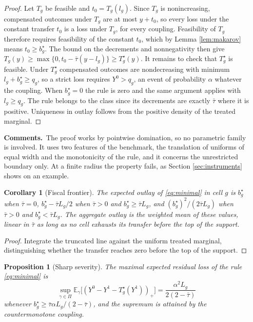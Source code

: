 \documentclass[11pt,a4paper]{article}
\theoremstyle{notesplain}
\newtheorem{proposition}[theorem]{Proposition}
\newtheorem{corollary}[theorem]{Corollary}
\theoremstyle{notesupright}
\numberwithin{equation}{section}
\newcommand{\comments}{\par\smallskip\noindent\textbf{Comments.}\ }
\newcommand{\E}{\mathbb{E}}
\begin{document}
\begin{proof}
Let $T_g$ be feasible and $t_0=T_g(l_g)$. Since $T_g$ is nonincreasing, compensated outcomes under $T_g$ are at most $y+t_0$, so every loss under the constant transfer $t_0$ is a loss under $T_g$, for every coupling. Feasibility of $T_g$ therefore requires feasibility of the constant $t_0$, which by Lemma \ref{lem:makarov} means $t_0\ge b^\star_g$. The bound on the decrements and nonnegativity then give $T_g(y)\ge\max\{0,t_0-\bar\tau(y-l_g)\}\ge T^\star_g(y)$. It remains to check that $T^\star_g$ is feasible. Under $T^\star_g$ compensated outcomes are nondecreasing with minimum $l_g+b^\star_g\ge q_g$, so a strict loss requires $Y^0>q_g$, an event of probability $\alpha$ whatever the coupling. When $b^\star_g=0$ the rule is zero and the same argument applies with $l_g\ge q_g$. The rule belongs to the class since its decrements are exactly $\bar\tau$ where it is positive. Uniqueness in outlay follows from the positive density of the treated marginal.
\end{proof}

\comments The proof works by pointwise domination, so no parametric family is involved. It uses two features of the benchmark, the translation of uniforms of equal width and the monotonicity of the rule, and it concerns the unrestricted boundary only. At a finite radius the property fails, as Section \ref{sec:instruments} shows on an example.

\begin{corollary}[Fiscal frontier]
\label{cor:frontier}
The expected outlay of \eqref{eq:minimal} in cell $g$ is $b^\star_g$ when $\bar\tau=0$, $b^\star_g-\bar\tau L_g/2$ when $\bar\tau>0$ and $b^\star_g\ge\bar\tau L_g$, and $(b^\star_g)^2/(2\bar\tau L_g)$ when $\bar\tau>0$ and $b^\star_g<\bar\tau L_g$. The aggregate outlay is the weighted mean of these values, linear in $\bar\tau$ as long as no cell exhausts its transfer before the top of the support.
\end{corollary}

\begin{proof}
Integrate the truncated line against the uniform treated marginal, distinguishing whether the transfer reaches zero before the top of the support.
\end{proof}

\begin{proposition}[Sharp severity]
\label{prop:severity}
The maximal expected residual loss of the rule \eqref{eq:minimal} is
\begin{equation}
\sup_{\gamma\in\Pi}\E_\gamma\big[(Y^0-Y^1-T^\star_g(Y^1))_+\big]=\frac{\alpha^2L_g}{2(2-\bar\tau)}
\label{eq:severity}
\end{equation}
whenever $b^\star_g\ge\bar\tau\alpha L_g/(2-\bar\tau)$, and the supremum is attained by the countermonotone coupling.
\end{proposition}
\end{document}
